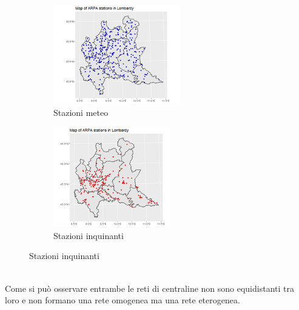 \documentclass{article}
\begin{document}
\begin{figure}[h!]         
    \centering
    \begin{subfigure}{.5\textwidth}
      \centering
      \includegraphics[width=.7\linewidth]{Picture/Lpollution.png}
      \caption{Stazioni meteo}
      \label{fig:sub1}
    \end{subfigure}%
    \begin{subfigure}{.5\textwidth}
      \centering
      \includegraphics[width=.7\linewidth]{Picture/Lweather.png}
      \caption{Stazioni inquinanti}
      \label{fig:sub2}
    \end{subfigure}
    \label{fig:test}
\end{figure}
\\Come si può osservare entrambe le reti di centraline non sono equidistanti tra loro e non formano 
una rete omogenea ma una rete eterogenea.
\end{document}
